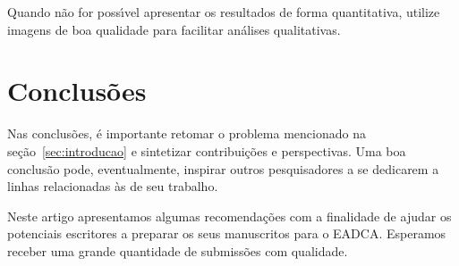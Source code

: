 \documentclass[11pt]{article}
\begin{document}
Quando n\~{a}o for poss\'{\i}vel apresentar os resultados de forma
quantitativa, utilize imagens de boa qualidade para facilitar an\'{a}lises
qualitativas.

\section{Conclus\~{o}es}

Nas conclus\~{o}es, \'{e} importante retomar o problema mencionado na
se\c{c}\~{a}o~\ref{sec:introducao} e sintetizar contribui\c{c}\~{o}es e perspectivas.
Uma boa conclus\~{a}o pode, eventualmente, inspirar outros pesquisadores a
se dedicarem a linhas relacionadas \`{a}s de seu trabalho.

Neste artigo apresentamos algumas recomenda\c{c}\~{o}es com a finalidade de
ajudar os potenciais escritores a preparar os seus manuscritos para o
EADCA. Esperamos receber uma grande quantidade de submiss\~{o}es com
qualidade.

  

   
\end{document}
